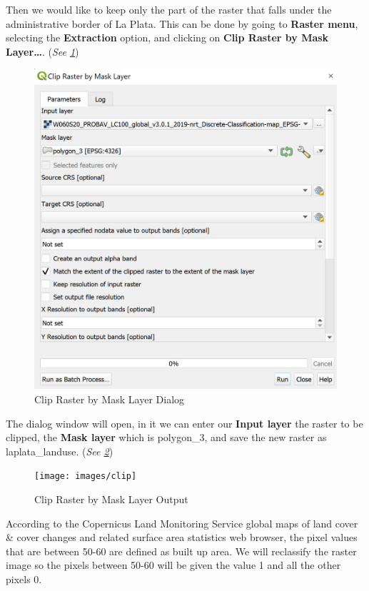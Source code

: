 \documentclass[
]{book}
\begin{document}
Then we would like to keep only the part of the raster that falls under the administrative border of La Plata. This can be done by going to \textbf{Raster menu}, selecting the \textbf{Extraction} option, and clicking on \textbf{Clip Raster by Mask Layer\ldots{}}. (\emph{See \ref{fig:img-215}})

\begin{figure}

{\centering \includegraphics[width=0.7\linewidth]{images/mask} 

}

\caption{Clip Raster by Mask Layer Dialog}\label{fig:img-215}
\end{figure}

The dialog window will open, in it we can enter our \textbf{Input layer} the raster to be clipped, the \textbf{Mask layer} which is {polygon\_3}, and save the new raster as {laplata\_landuse}. (\emph{See \ref{fig:img-216}})

\begin{figure}

{\centering \texttt{[image: images/clip]} 

}

\caption{Clip Raster by Mask Layer Output}\label{fig:img-216}
\end{figure}

According to the Copernicus Land Monitoring Service global maps of land cover \& cover changes and related surface area statistics web browser, the pixel values that are between 50-60 are defined as built up area.
We will reclassify the raster image so the pixels between 50-60 will be given the value 1 and all the other pixels 0.
\end{document}
